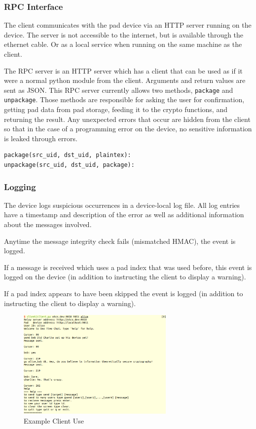 \documentclass[twocolumn]{article}
\begin{document}
\subsubsection{RPC Interface}
The client communicates with the pad device via an HTTP server running on the device. The server is not accessible to the internet, but is available through the ethernet cable. Or as a local service when running on the same machine as the client.

The RPC server is an HTTP server which has a client that can be used as if it were a normal python module
from the client. Arguments and return values are sent as JSON.
This RPC server currently allows two methods, \texttt{package} and \texttt{unpackage}.
Those methods are responsible for asking the user for confirmation, getting pad data from pad storage, feeding it to the crypto functions, and returning the result. Any unexpected errors that occur are hidden from the client so that in the case of a programming error on the device, no sensitive information is leaked through errors.

\begin{lstlisting}
package(src_uid, dst_uid, plaintex):
unpackage(src_uid, dst_uid, package):
\end{lstlisting}

\subsubsection{Logging}
The device logs suspicious occurrences in a device-local log file.
All log entries have a timestamp and description of the error as well as
additional information about the messages involved.

Anytime the message integrity check fails (mismatched HMAC), the event
is logged.

If a message is received which uses a pad index that was used before,
this event is logged on the device (in addition to instructing the client
to display a warning).

If a pad index appears to have been skipped the event is logged
(in addition to instructing the client
to display a warning).

\begin{figure}[htp]
\centering
\includegraphics[width=3in]{sample}
\caption{Example Client Use}
\end{figure}
\label{sec:clientexample}
\end{document}
